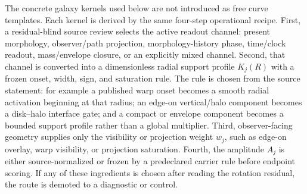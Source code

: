 \documentclass[11pt]{article}
\begin{document}
The concrete galaxy kernels used below are not introduced as free curve
templates.  Each kernel is derived by the same four-step operational recipe.
First, a residual-blind source review selects the active readout channel:
present morphology, observer/path projection, morphology-history phase,
time/clock readout, mass/envelope closure, or an explicitly mixed channel.
Second, that channel is converted into a dimensionless radial support profile
\(K_j(R)\) with a frozen onset, width, sign, and saturation rule.  The rule is
chosen from the source statement: for example a published warp onset becomes a
smooth radial activation beginning at that radius; an edge-on vertical/halo
component becomes a disk--halo interface gate; and a compact or envelope
component becomes a bounded support profile rather than a global multiplier.
Third, observer-facing geometry supplies only the visibility or projection
weight \(w_j\), such as edge-on overlay, warp visibility, or projection
saturation.  Fourth, the amplitude \(A_j\) is either source-normalized or
frozen by a predeclared carrier rule before endpoint scoring.  If any of these
ingredients is chosen after reading the rotation residual, the route is
demoted to a diagnostic or control.
\end{document}
